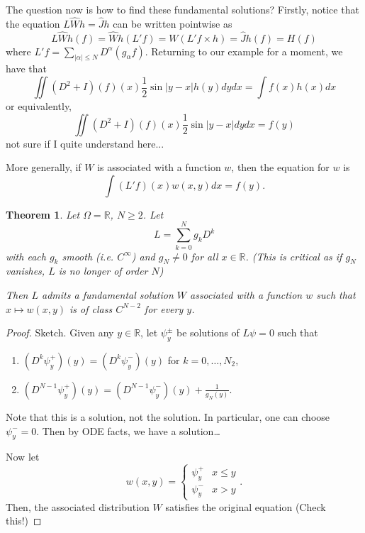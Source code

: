 \documentclass[letterpaper,twoside,11pt]{article}
\theoremstyle{mystyle}
\newtheorem{theorem}{Theorem}[section]
\newcommand{\R}{{\mathbb R}}
\newcommand{\cbk}{\color{black}}
\newcommand{\cred}{\color{red}}
\begin{document}
The question now is how to find these fundamental solutions? Firstly, notice that the equation $L\hat Wh = \hat J h$ can be written pointwise as 
\[L\hat Wh\left( f \right) = \hat Wh\left( {L'f} \right) = W\left( {L'f \times h} \right) = \hat Jh\left( f \right) = H\left( f \right)\] where $L'f=\sum_{|\alpha|\leq N} D^\alpha\left( g_\alpha f \right)$.
Returning to our example for a moment, we have that 
\[\iint {\left( {{D^2} + I} \right)\left( f \right)\left( x \right)\frac{1}{2}\sin \left| {y - x} \right|h\left( y \right)dydx} = \int {f\left( x \right)h\left( x \right)dx} \]
or equivalently, 
\[\iint {\left( {{D^2} + I} \right)\left( f \right)\left( x \right)\frac{1}{2}\sin \left| {y - x} \right|dydx} = f\left( y \right)\]
\cred not sure if I quite understand here...\cbk 

More generally, if $W$ is associated with a function $w$, then the equation for $w$ is 
\[\int \left( L'f \right)(x) w(x, y) dx = f(y) .\]

\begin{tcolorbox}[colback=red!5!white,colframe=red!75!black]
\begin{theorem}
  Let $\Omega=\R$, $N\geq 2$. Let 
  \[L = \sum_{k=0}^N g_k D^k\] with each $g_k$ smooth (i.e. $C^\infty$) and $g_N \neq 0$ for all $ x \in \R$. (This is critical as if $g_N$ vanishes, $L$ is no longer of order $N$)

  Then $L$ admits a fundamental solution $W$ associated with a function $w$ such that $x \mapsto w\left( x, y \right)$ is of class $C^{N-2}$ for every $y$. 
\end{theorem}
\end{tcolorbox}

\begin{proof}
  Sketch. Given any $y \in \R$, let $\psi_y^\pm$ be solutions of $L\psi = 0$ such that 
  \begin{enumerate}[label=(\arabic*)]
    \item $\left( D^k \psi_y^+ \right)(y) = \left( D^k \psi_y^- \right)(y)$ for $k = 0, \dots, N_2$,
    \item $\left( D^{N-1} \psi_y^+ \right)(y) = \left( D^{N-1}\psi_y^-  \right)(y) + \frac{1}{g_N(y)}$. 
  \end{enumerate}
  Note that this is a solution, not the solution. In particular, one can choose $\psi_y^- = 0$. 
  Then by ODE facts, we have a solution\dots
  
  Now let 
  \[w\left( x, y \right) = \left\{ \begin{matrix}
    {\psi_y^+}&{x \leq y } \\[.2cm] 
    {\psi_y^-} & {x > y} 
  \end{matrix}
  \right. .\]
  Then, the associated distribution $W$ satisfies the original equation \cred (Check this!) \cbk 
\end{proof}
\end{document}
